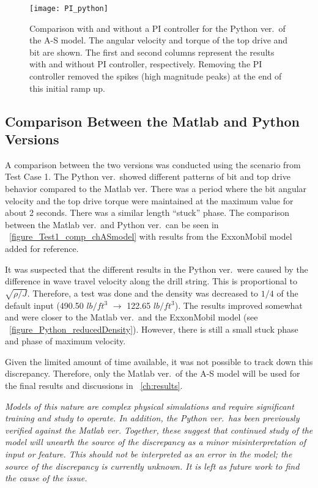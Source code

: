\begin{figure}
  \centering
  \texttt{[image: PI\_python]}
  \caption[Comparison with and without a PI controller for the Python ver.\ of the A-S model]{Comparison with and without a PI controller for the Python ver.\ of the A-S model. The angular velocity and torque of the top drive and bit are shown. The first and second columns represent the results with and without PI controller, respectively. Removing the PI controller removed the spikes (high magnitude peaks) at the end of this initial ramp up.}
  \label{figure_topdriveremove}
\end{figure}

\subsection{Comparison Between the Matlab and Python Versions}
A comparison between the two versions was conducted using the scenario from Test Case 1. The Python ver.\ showed different patterns of bit and top drive behavior compared to the Matlab ver. There was a period where the bit angular velocity and the top drive torque were maintained at the maximum value for about 2 seconds. There was a similar length ``stuck'' phase. The comparison between the Matlab ver.\ and Python ver.\ can be seen in \figurename~\ref{figure_Test1_comp_chASmodel} with results from the ExxonMobil model added for reference.

It was suspected that the different results in the Python ver.\ were caused by the difference in wave travel velocity along the drill string. This is proportional to $\sqrt{\rho/J}$.  Therefore, a test was done and the density was decreased to $1/4$ of the default input (490.50 $lb/ft^3$ $\rightarrow$ 122.65 $lb/ft^3$). The results improved somewhat and were closer to the Matlab ver.\ and the ExxonMobil model (see \figurename~\ref{figure_Python_reducedDensity}). However, there is still a small stuck phase and phase of maximum velocity.

Given the limited amount of time available, it was not possible to track down this discrepancy. Therefore, only the Matlab ver.\ of the A-S model will be used for the final results and discussions in \chaptername~\ref{ch:results}.

\emph{Models of this nature are complex physical simulations and require significant training and study to operate. In addition, the Python ver.\ has been previously verified against the Matlab ver. Together, these suggest that continued study of the model will unearth the source of the discrepancy as a minor misinterpretation of input or feature. This should not be interpreted as an error in the model; the source of the discrepancy is currently unknown. It is left as future work to find the cause of the issue.}


